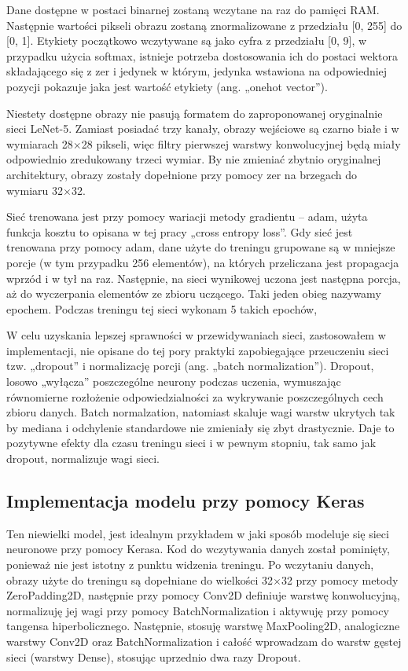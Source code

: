 Dane dostępne w postaci binarnej zostaną wczytane na raz do pamięci RAM.
Następnie wartości pikseli obrazu zostaną znormalizowane z przedziału
{[}0, 255{]} do {[}0, 1{]}. Etykiety początkowo wczytywane są jako cyfra
z przedziału {[}0, 9{]}, w przypadku użycia softmax, istnieje potrzeba
dostosowania ich do postaci wektora składającego się z zer i jedynek w
którym, jedynka wstawiona na odpowiedniej pozycji pokazuje jaka jest
wartość etykiety (ang. „onehot vector'').

Niestety dostępne obrazy nie pasują formatem do zaproponowanej
oryginalnie sieci LeNet-5. Zamiast posiadać trzy kanały, obrazy
wejściowe są czarno białe i w wymiarach 28\(\times\)28 pikseli, więc
filtry pierwszej warstwy konwolucyjnej będą miały odpowiednio
zredukowany trzeci wymiar. By nie zmieniać zbytnio oryginalnej
architektury, obrazy zostały dopełnione przy pomocy zer na brzegach do
wymiaru 32\(\times\)32.

Sieć trenowana jest przy pomocy wariacji metody gradientu -- adam, użyta
funkcja kosztu to opisana w tej pracy „cross entropy loss''. Gdy sieć
jest trenowana przy pomocy adam, dane użyte do treningu grupowane są w
mniejsze porcje (w tym przypadku 256 elementów), na których przeliczana
jest propagacja wprzód i w tył na raz. Następnie, na sieci wynikowej
uczona jest następna porcja, aż do wyczerpania elementów ze zbioru
uczącego. Taki jeden obieg nazywamy epochem. Podczas treningu tej sieci
wykonam 5 takich epochów,

W celu uzyskania lepszej sprawności w przewidywaniach sieci,
zastosowałem w implementacji, nie opisane do tej pory praktyki
zapobiegające przeuczeniu sieci tzw. „dropout'' i normalizację porcji
(ang. „batch normalization''). Dropout, losowo „wyłącza'' poszczególne
neurony podczas uczenia, wymuszając równomierne rozłożenie
odpowiedzialności za wykrywanie poszczególnych cech zbioru danych. Batch
normalzation, natomiast skaluje wagi warstw ukrytych tak by mediana i
odchylenie standardowe nie zmieniały się zbyt drastycznie. Daje to
pozytywne efekty dla czasu treningu sieci i w pewnym stopniu, tak samo
jak dropout, normalizuje wagi
sieci.

\subsection{Implementacja modelu przy pomocy Keras}

Ten niewielki model, jest idealnym przykładem w jaki sposób modeluje się sieci neuronowe przy pomocy Kerasa. 
Kod do wczytywania danych został pominięty, ponieważ nie jest istotny z punktu widzenia treningu. 
Po wczytaniu danych, obrazy użyte do treningu są dopełniane do wielkości 32\(\times\)32 przy pomocy metody ZeroPadding2D, 
następnie przy pomocy Conv2D definiuje warstwę konwolucyjną, normalizuję jej wagi przy pomocy BatchNormalization i 
aktywuję przy pomocy tangensa hiperbolicznego. Następnie, stosuję warstwę MaxPooling2D, analogiczne warstwy 
Conv2D oraz BatchNormalization i całość wprowadzam do warstw gęstej sieci (warstwy Dense), stosując uprzednio dwa razy Dropout.

